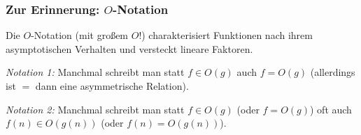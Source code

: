 \documentclass[aspectratio=1610,onlymath]{beamer}
\begin{document}
\begin{frame}\frametitle{Zur Erinnerung: $O$-Notation}

Die $O$-Notation (mit großem $O$!) charakterisiert Funktionen nach ihrem asymptotischen Verhalten und
versteckt lineare Faktoren.

\pause

\emph{Notation 1:} Manchmal schreibt man statt $f\in O(g)$ auch $f=O(g)$ (allerdings ist $=$ dann eine
asymmetrische Relation).\medskip

\emph{Notation 2:} Manchmal schreibt man statt $f\in O(g)$ (oder $f=O(g)$) oft auch $f(n)\in O(g(n))$ (oder $f(n)=O(g(n))$).


\end{frame}
\end{document}
